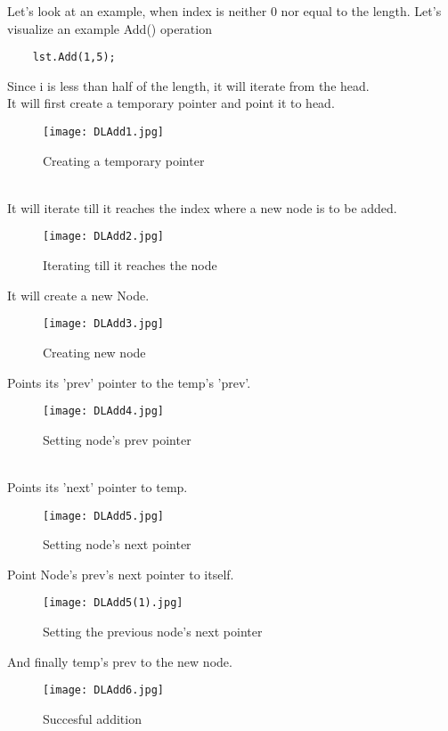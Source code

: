 \documentclass[11pt,fleqn]{book} %
\begin{document}
\begin{example}
	Let's look at an example, when index is neither 0 nor equal to the length.
	Let's visualize an example Add() operation\\
	\begin{lstlisting}
	lst.Add(1,5);
	\end{lstlisting}
	Since i is less than half of the length, it will iterate from the head.\\
	It will first create a temporary pointer and point it to head.
	\begin{figure}[H]
		\centering
		\texttt{[image: DLAdd1.jpg]}
		\caption{Creating a temporary pointer}
	\end{figure} ~\\
	It will iterate till it reaches the index where a new node is to be added.
	\begin{figure}[H]
		\centering
		\texttt{[image: DLAdd2.jpg]}
		\caption{Iterating till it reaches the node}
	\end{figure}
	It will create a new Node.
	\begin{figure}[H]
		\centering
		\texttt{[image: DLAdd3.jpg]}
		\caption{Creating new node}
	\end{figure}
	Points its 'prev' pointer to the temp's 'prev'.
	\begin{figure}[H]
		\centering
		\texttt{[image: DLAdd4.jpg]}
		\caption{Setting node's prev pointer}
	\end{figure}~\\
	Points its 'next' pointer to temp.
	\begin{figure}[H]
		\centering
		\texttt{[image: DLAdd5.jpg]}
		\caption{Setting node's next pointer}
	\end{figure}
	Point Node's prev's next pointer to itself.
	\begin{figure}[H]
		\centering
		\texttt{[image: DLAdd5(1).jpg]}
		\caption{Setting the previous node's next pointer}
	\end{figure}
	And finally temp's prev to the new node.
	\begin{figure}[H]
		\centering
		\texttt{[image: DLAdd6.jpg]}
		\caption{Succesful addition}
	\end{figure}
\end{example}
\end{document}
